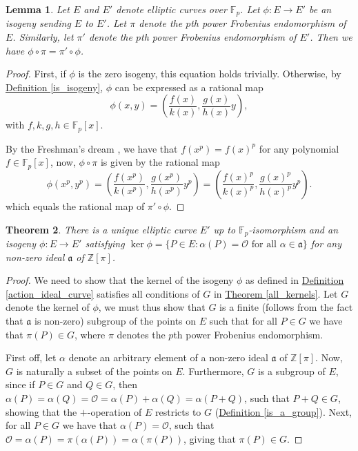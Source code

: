 \documentclass[openany, a4paper, 10pt]{book}
\theoremstyle{plain}
\newtheorem{theorem}{Theorem}[chapter]
\theoremstyle{plain}
\theoremstyle{plain}
\newtheorem{lemma}[theorem]{Lemma}
\theoremstyle{definition}
\theoremstyle{plain}
\theoremstyle{definition}
\theoremstyle{remark}
\newcommand{\defref}[1]{\hyperref[#1]{Definition \ref{#1}}}
\newcommand{\theoref}[1]{\hyperref[#1]{Theorem \ref{#1}}}
\begin{document}
\begin{lemma}\label{commute_frobenius}
    Let $E$ and $E'$ denote elliptic curves over $\mathbb F_p$.
    Let $\phi: E \to E'$ be an isogeny sending $E$ to $E'$.
    Let $\pi$ denote the $p$th power Frobenius endomorphism of $E$.
    Similarly, let $\pi'$ denote the $p$th power Frobenius endomorphism of $E'$.
    Then we have $\phi \circ \pi = \pi' \circ \phi$.
\end{lemma}
\begin{proof}
    First, if $\phi$ is the zero isogeny, this equation holds trivially.
    Otherwise, by \defref{is_isogeny}, $\phi$ can be expressed as a rational map
    \begin{equation*}
        \phi(x, y) = \left( \frac{f(x)}{k(x)}, \frac{g(x)}{h(x)}y \right),
    \end{equation*}
    with $f,k,g,h \in \mathbb F_p[x]$.

    By the Freshman's dream \cite[Example~9.42]{freshman}, we have that $f(x^p)=f(x)^p$ for any polynomial $f \in \mathbb F_p[x]$, now, $\phi \circ \pi$ is given by the rational map
    \begin{equation*}
        \phi(x^p, y^p) = \left( \frac{f(x^p)}{k(x^p)}, \frac{g(x^p)}{h(x^p)}y^p \right) = \left( \frac{f(x)^p}{k(x)^p}, \frac{g(x)^p}{h(x)^p}y^p \right).
    \end{equation*}
    which equals the rational map of $\pi' \circ \phi$.
\end{proof}

\begin{theorem}\label{all_kernels2}
    There is a unique elliptic curve $E'$ up to $\mathbb F_p$-isomorphism and an isogeny $\phi: E \to E'$ satisfying $\ker \phi = \{ P \in E: \alpha(P) = \mathcal O \text{ for all } \alpha \in \mathfrak a \}$ for any non-zero ideal $\mathfrak a$ of $\mathbb Z[\pi]$.
\end{theorem}
\begin{proof}
    We need to show that the kernel of the isogeny $\phi$ as defined in \defref{action_ideal_curve} satisfies all conditions of $G$ in \theoref{all_kernels}.
    Let $G$ denote the kernel of $\phi$, we must thus show that $G$ is a finite (follows from the fact that $\mathfrak a$ is non-zero) subgroup of the points on $E$ such that for all $P \in G$ we have that $\pi(P) \in G$, where $\pi$ denotes the $p$th power Frobenius endomorphism.

    First off, let $\alpha$ denote an arbitrary element of a non-zero ideal $\mathfrak a$ of $\mathbb Z[\pi]$.
    Now, $G$ is naturally a subset of the points on $E$.
    Furthermore, $G$ is a subgroup of $E$, since if $P \in G$ and $Q \in G$, then $\alpha(P)=\alpha(Q)=\mathcal O=\alpha(P) + \alpha(Q) = \alpha(P+Q)$, such that $P+Q \in G$, showing that the $+$-operation of $E$ restricts to $G$ (\defref{is_a_group}).
    Next, for all $P \in G$ we have that $\alpha(P) = \mathcal O$, such that $\mathcal O = \alpha(P) = \pi(\alpha(P)) = \alpha(\pi(P))$, giving that $\pi(P) \in G$.
\end{proof}
\end{document}
